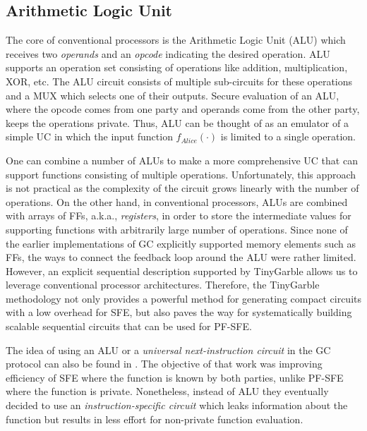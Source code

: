 \subsection{Arithmetic Logic Unit}\label{ssec:processor-alu}
The core of conventional processors is the Arithmetic Logic Unit (ALU) which receives two \emph{operands} and an \emph{opcode} indicating the desired operation.
ALU supports an operation set consisting of operations like addition, multiplication, XOR, etc.
The ALU circuit consists of multiple sub-circuits for these operations and a MUX which selects one of their outputs.
Secure evaluation of an ALU, where the opcode comes from one party and operands come from the other party, keeps the operations private.
Thus, ALU can be thought of as an emulator of a simple UC in which the input function $f_{Alice}(\cdot)$ is limited to a single operation.

One can combine a number of ALUs to make a more comprehensive UC that can support functions consisting of multiple operations.
Unfortunately, this approach is not practical as the complexity of the circuit grows linearly with the number of operations.
On the other hand, in conventional processors, ALUs are combined with arrays of FFs, a.k.a., \emph{registers}, in order to store the intermediate values for supporting functions with arbitrarily large number of operations.
Since none of the earlier implementations of GC explicitly supported memory elements such as FFs, the ways to connect the feedback loop around the ALU were rather limited.
However, an explicit sequential description supported by TinyGarble allows us to leverage conventional processor architectures.
Therefore, the TinyGarble methodology not only provides a powerful method for generating compact circuits with a low overhead for SFE, but also paves the way for systematically building scalable sequential circuits that can be used for PF-SFE.

The idea of using an ALU or a \emph{universal next-instruction circuit} in the GC protocol can also be found in \cite{liu2014automating}.
The objective of that work was improving efficiency of SFE where the function is known by both parties, unlike PF-SFE where the function is private.
Nonetheless, instead of ALU they eventually decided to use an \emph{instruction-specific circuit} which leaks information about the function but results in less effort for non-private function evaluation.

